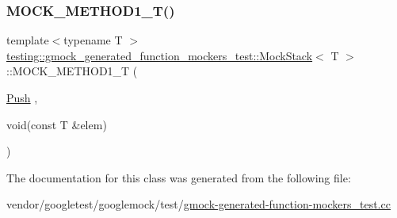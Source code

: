 \mbox{\label{classtesting_1_1gmock__generated__function__mockers__test_1_1_mock_stack_a0ad833bc6134c5150b8271a5ba2e91b5}} 
\subsubsection{\texorpdfstring{M\+O\+C\+K\+\_\+\+M\+E\+T\+H\+O\+D1\+\_\+\+T()}{MOCK\_METHOD1\_T()}}
{\footnotesize\ttfamily template$<$typename T $>$ \\
\hyperlink{classtesting_1_1gmock__generated__function__mockers__test_1_1_mock_stack}{testing\+::gmock\+\_\+generated\+\_\+function\+\_\+mockers\+\_\+test\+::\+Mock\+Stack}$<$ T $>$\+::M\+O\+C\+K\+\_\+\+M\+E\+T\+H\+O\+D1\+\_\+T (\begin{DoxyParamCaption}\item[{\hyperlink{classtesting_1_1gmock__generated__function__mockers__test_1_1_stack_interface_a49448f6195021fee947d37b80b6e5d30}{Push}}]{,  }\item[{void(const T \&elem)}]{ }\end{DoxyParamCaption})}



The documentation for this class was generated from the following file\+:\begin{DoxyCompactItemize}
\item 
vendor/googletest/googlemock/test/\hyperlink{gmock-generated-function-mockers__test_8cc}{gmock-\/generated-\/function-\/mockers\+\_\+test.\+cc}\end{DoxyCompactItemize}
